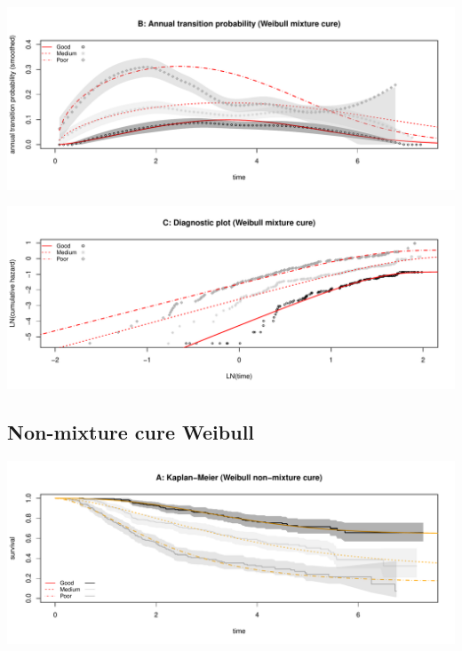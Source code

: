\documentclass[
]{article}
\begin{document}
\begin{flushleft}\includegraphics[height=0.25\textheight]{Images/cure_weib_mix-2} \end{flushleft}

\begin{flushleft}\includegraphics[height=0.25\textheight]{Images/cure_weib_mix-3} \end{flushleft}

\clearpage

\hypertarget{non-mixture-cure-weibull}{%
\subsection{Non-mixture cure Weibull}\label{non-mixture-cure-weibull}}

\begin{flushleft}\includegraphics[height=0.25\textheight]{Images/cure_weib_nmix-1} \end{flushleft}
\end{document}
